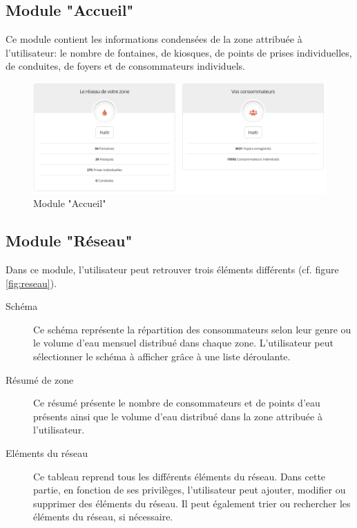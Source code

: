 \documentclass{EPL-master-thesis-covers-FR}
\begin{document}
			
			\subsection*{Module "Accueil"}
				Ce module contient les informations condensées de la zone attribuée à l'utilisateur: le nombre de fontaines, de kiosques, de points de prises individuelles, de conduites, de foyers et de consommateurs individuels. 
								
				\begin{figure}[H]
					\centering
					\includegraphics[width=1\textwidth]{images/dashboard}
					\caption{Module "Accueil"}
				\end{figure}
				
				
			\subsection*{Module "Réseau"}
				\label{sec:reseau}
				Dans ce module, l'utilisateur peut retrouver trois éléments différents (cf. figure \ref{fig:reseau}).
				
				\begin{description}
				\item[Schéma] Ce schéma représente la répartition des consommateurs selon leur genre ou le volume d'eau mensuel distribué dans chaque zone. L'utilisateur peut sélectionner le schéma à afficher grâce à une liste déroulante.
				\item[Résumé de zone] Ce résumé présente le nombre de consommateurs et de points d'eau présents ainsi que le volume d'eau distribué dans la zone attribuée à l'utilisateur.
				\item[Eléments du réseau] Ce tableau reprend tous les différents éléments du réseau. Dans cette partie, en fonction de ses privilèges, l'utilisateur peut ajouter, modifier ou supprimer des éléments du réseau. Il peut également trier ou rechercher les éléments du réseau, si nécessaire.
				\end{description}
				
\end{document}
